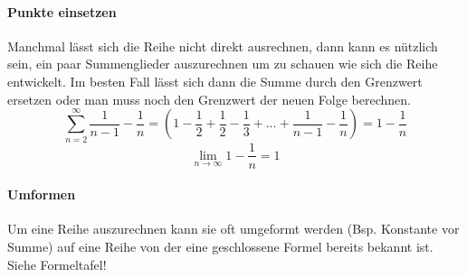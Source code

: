 \paragraph{Punkte einsetzen}
\vspace{-0.2cm}
Manchmal lässt sich die Reihe nicht direkt ausrechnen, dann kann es nützlich sein, ein paar Summenglieder auszurechnen um zu schauen wie sich die Reihe entwickelt. Im besten Fall lässt sich dann die Summe durch den Grenzwert ersetzen oder man muss noch den Grenzwert der neuen Folge berechnen. 
\[
	\sum_{n=2}^\infty \frac{1}{n-1} - \frac{1}{n} = \left( 1 - \frac{1}{2} + \frac{1}{2} - \frac{1}{3} + \ldots + \frac{1}{n-1} - \frac{1}{n} \right) = 1 - \frac{1}{n}
\]
\[
	\lim_{n \to \infty} 1 - \frac{1}{n} = 1
\]

\paragraph{Umformen}
\vspace{-0.2cm}
Um eine Reihe auszurechnen kann sie oft umgeformt werden (Bsp. Konstante vor Summe) auf eine Reihe von der eine geschlossene Formel bereits bekannt ist. Siehe Formeltafel!
